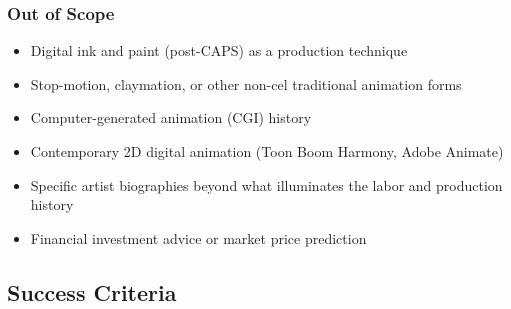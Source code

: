 \documentclass[11pt,letterpaper]{article}
\begin{document}
\subsubsection{Out of Scope}
\begin{itemize}
  \item Digital ink and paint (post-CAPS) as a production technique
  \item Stop-motion, claymation, or other non-cel traditional animation forms
  \item Computer-generated animation (CGI) history
  \item Contemporary 2D digital animation (Toon Boom Harmony, Adobe Animate)
  \item Specific artist biographies beyond what illuminates the labor and production history
  \item Financial investment advice or market price prediction
\end{itemize}

\subsection{Success Criteria}
\end{document}
